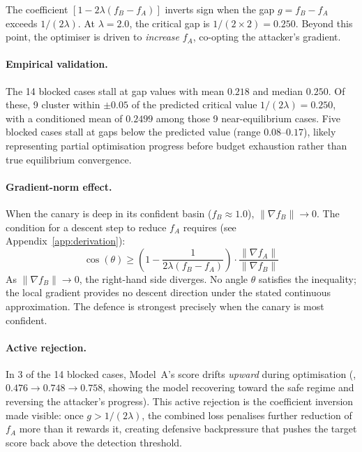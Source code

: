 The coefficient $[1 - 2\lambda(f_B - f_A)]$ inverts sign when the gap $g = f_B - f_A$ exceeds $1/(2\lambda)$. At $\lambda = 2.0$, the critical gap is $1/(2 \times 2) = 0.250$. Beyond this point, the optimiser is driven to \emph{increase} $f_A$, co-opting the attacker's gradient.

\paragraph{Empirical validation.} The 14 blocked cases stall at gap values with mean $0.218$ and median $0.250$. Of these, 9 cluster within $\pm 0.05$ of the predicted critical value $1/(2\lambda) = 0.250$, with a conditioned mean of $0.2499$ among those 9 near-equilibrium cases. Five blocked cases stall at gaps below the predicted value (range $0.08$--$0.17$), likely representing partial optimisation progress before budget exhaustion rather than true equilibrium convergence.

\paragraph{Gradient-norm effect.} When the canary is deep in its confident basin ($f_B \approx 1.0$), $\|\nabla f_B\| \to 0$. The condition for a descent step to reduce $f_A$ requires (see Appendix~\ref{app:derivation}):
\begin{equation}
\cos(\theta) \geq \left(1 - \frac{1}{2\lambda(f_B - f_A)}\right) \cdot \frac{\|\nabla f_A\|}{\|\nabla f_B\|}
\end{equation}
As $\|\nabla f_B\| \to 0$, the right-hand side diverges. No angle $\theta$ satisfies the inequality; the local gradient provides no descent direction under the stated continuous approximation. The defence is strongest precisely when the canary is most confident.

\paragraph{Active rejection.} In 3 of the 14 blocked cases, Model~A's score drifts \emph{upward} during optimisation (\eg, $0.476 \to 0.748 \to 0.758$, showing the model recovering toward the safe regime and reversing the attacker's progress). This active rejection is the coefficient inversion made visible: once $g > 1/(2\lambda)$, the combined loss penalises further reduction of $f_A$ more than it rewards it, creating defensive backpressure that pushes the target score back above the detection threshold.

